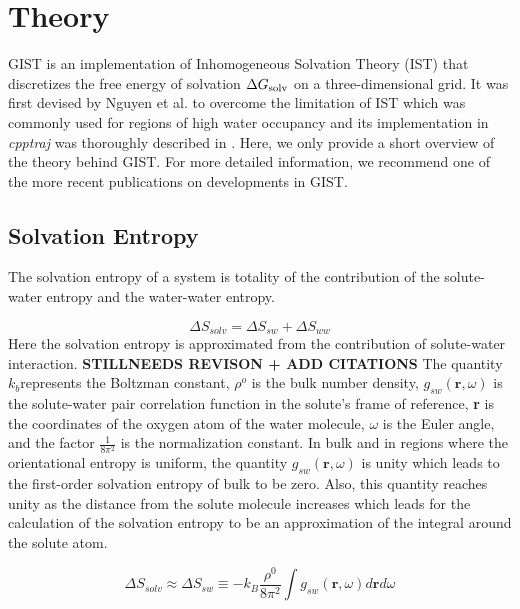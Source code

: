 \documentclass[9pt,tutorial]{livecoms}
\newcommand{\dgsolv}{\Delta G_\textup{solv}}
\newcommand{\software}{\emph}
\begin{document}
\section{Theory}
GIST is an implementation of Inhomogeneous Solvation Theory (IST) \cite{Lazaridis1998} that discretizes  the free energy of solvation $\dgsolv$ on a three-dimensional grid. 
It was first devised by Nguyen et al. \cite{Nguyen2012} to overcome the limitation of IST which was commonly used for regions of high water occupancy and its implementation in \software{cpptraj} was thoroughly described in \cite{Ramsey2016}.
Here, we only provide a short overview of the theory behind GIST.
For more detailed information, we recommend one of the more recent publications on developments in GIST. \cite{Kraml2020}\cite{Chen2021}


\subsection{Solvation Entropy}
The solvation entropy of a system is totality of the contribution of the  solute-water entropy and the water-water entropy. 

\begin{equation}
	\Delta S_\textit{solv} = \Delta S_\textit{sw} + \Delta S_\textit{ww}
\end{equation}
Here the solvation entropy is approximated from the contribution of solute-water interaction. 
\textbf{STILLNEEDS REVISON + ADD CITATIONS} The quantity $k_\textit{b}$represents the Boltzman constant, 
$\rho^\textit{o}$ is the bulk number density, $g_\textit{sw}\left(\textbf{r},\omega \right)$ is the solute-water 
pair correlation function in the solute's frame of reference, \textbf{r} is the coordinates of the oxygen atom of the water molecule,  
$\omega$ is the Euler angle, and the factor $\frac{1}{8\pi^2}$ is the normalization constant. In bulk and in regions where the orientational 
entropy is uniform, the quantity $g_\textit{sw}\left(\textbf{r},\omega \right)$ is unity which leads to the first-order solvation entropy of 
bulk to be zero. Also, this quantity reaches unity as the distance from the solute molecule increases which leads for the calculation of 
the solvation entropy to be an approximation of the integral around the solute atom. 

\begin{equation}
	\Delta S_\textit{solv} \approx \Delta S_\textit{sw} \equiv -k_\textit{B} \frac{\rho^\textit{0}}{8\pi^\textit{2}} \int g_\textit{sw} \left(\textbf{r}, \omega \right) d\textbf{r}d\omega
\end{equation}
\end{document}
